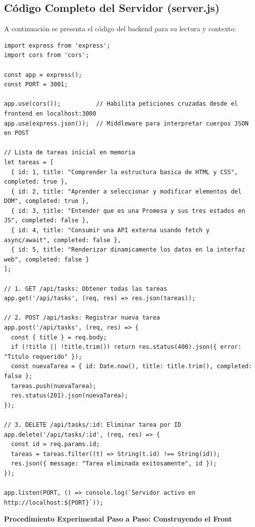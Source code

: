 \documentclass[10pt,letterpaper]{article}
\newcommand{\sectionBadge}[1]{%
  \refstepcounter{section}%
  \vspace{0.24cm}%
  \noindent%
  \colorbox{icesiBlue}{\color{white}\rule[-0.08cm]{0pt}{0.42cm}\hspace{0.16cm}\textbf{\normalsize \thesection}\hspace{0.16cm}}%
  \hspace{0.18cm}%
  {\fontsize{9.5}{12}\selectfont\textbf{\color{icesiDark}#1}}\\[-0.10cm]%
  \noindent{\color{icesiDark}\rule{\textwidth}{0.8pt}}\vspace{0.10cm}%
}
\begin{document}
\subsection{Código Completo del Servidor (server.js)}
A continuación se presenta el código del backend para su lectura y contexto:

\begin{lstlisting}[style=jsstyle]
import express from 'express';
import cors from 'cors';

const app = express();
const PORT = 3001;

app.use(cors());          // Habilita peticiones cruzadas desde el frontend en localhost:3000
app.use(express.json());  // Middleware para interpretar cuerpos JSON en POST

// Lista de tareas inicial en memoria
let tareas = [
  { id: 1, title: "Comprender la estructura basica de HTML y CSS", completed: true },
  { id: 2, title: "Aprender a seleccionar y modificar elementos del DOM", completed: true },
  { id: 3, title: "Entender que es una Promesa y sus tres estados en JS", completed: false },
  { id: 4, title: "Consumir una API externa usando fetch y async/await", completed: false },
  { id: 5, title: "Renderizar dinamicamente los datos en la interfaz web", completed: false }
];

// 1. GET /api/tasks: Obtener todas las tareas
app.get('/api/tasks', (req, res) => res.json(tareas));

// 2. POST /api/tasks: Registrar nueva tarea
app.post('/api/tasks', (req, res) => {
  const { title } = req.body;
  if (!title || !title.trim()) return res.status(400).json({ error: "Titulo requerido" });
  const nuevaTarea = { id: Date.now(), title: title.trim(), completed: false };
  tareas.push(nuevaTarea);
  res.status(201).json(nuevaTarea);
});

// 3. DELETE /api/tasks/:id: Eliminar tarea por ID
app.delete('/api/tasks/:id', (req, res) => {
  const id = req.params.id;
  tareas = tareas.filter((t) => String(t.id) !== String(id));
  res.json({ message: "Tarea eliminada exitosamente", id });
});

app.listen(PORT, () => console.log(`Servidor activo en http://localhost:${PORT}`));
\end{lstlisting}

\sectionBadge{Procedimiento Experimental Paso a Paso: Construyendo el Front}
\end{document}
